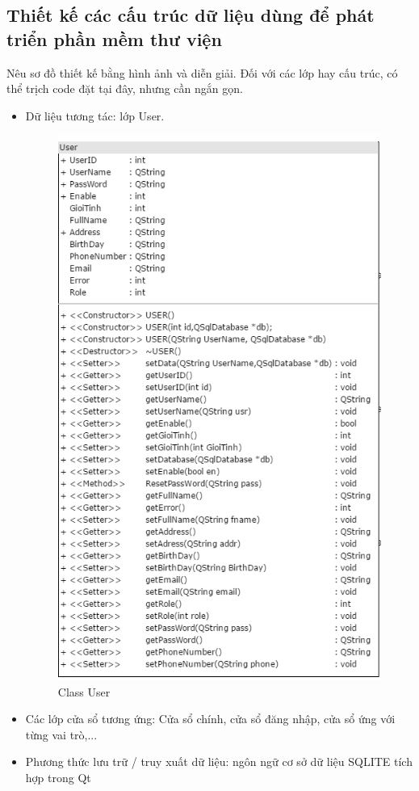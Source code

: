 \documentclass[a4paper]{article}
\begin{document}
\subsection{Thiết kế các cấu trúc dữ liệu dùng để phát triển phần mềm thư viện}
Nêu sơ đồ thiết kế bằng hình ảnh và diễn giải. Đối với các lớp hay cấu trúc, có thể trịch code đặt tại đây, nhưng cần ngắn gọn.
\begin{itemize}
	\item Dữ liệu tương tác: lớp User.\\
	\begin{figure}[h!]
	\begin{center}
		\includegraphics[scale=.8]{Diagram_User.png}
		\caption{Class User}
	\end{center}
	\end{figure}
	\newpage \newpage 
	\item Các lớp cửa sổ tương ứng: Cửa sổ chính, cửa sổ đăng nhập, cửa sổ ứng với từng vai trò,...
	\item Phương thức lưu trữ / truy xuất dữ liệu: ngôn ngữ cơ sở dữ liệu SQLITE tích hợp trong Qt
\end{itemize}
\end{document}
